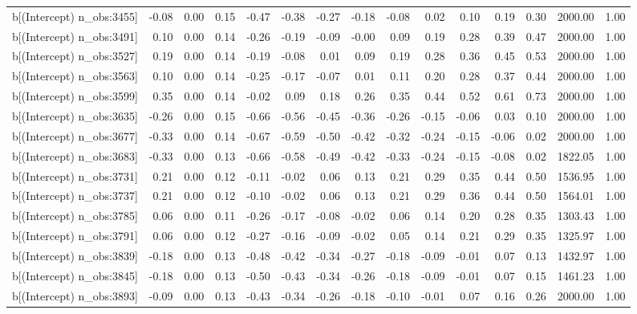 \begin{table}[ht]
\begin{tabular}{rrrrrrrrrrrrrrr}
  b[(Intercept) n\_obs:3455] & -0.08 & 0.00 & 0.15 & -0.47 & -0.38 & -0.27 & -0.18 & -0.08 & 0.02 & 0.10 & 0.19 & 0.30 & 2000.00 & 1.00 \\ 
  b[(Intercept) n\_obs:3491] & 0.10 & 0.00 & 0.14 & -0.26 & -0.19 & -0.09 & -0.00 & 0.09 & 0.19 & 0.28 & 0.39 & 0.47 & 2000.00 & 1.00 \\ 
  b[(Intercept) n\_obs:3527] & 0.19 & 0.00 & 0.14 & -0.19 & -0.08 & 0.01 & 0.09 & 0.19 & 0.28 & 0.36 & 0.45 & 0.53 & 2000.00 & 1.00 \\ 
  b[(Intercept) n\_obs:3563] & 0.10 & 0.00 & 0.14 & -0.25 & -0.17 & -0.07 & 0.01 & 0.11 & 0.20 & 0.28 & 0.37 & 0.44 & 2000.00 & 1.00 \\ 
  b[(Intercept) n\_obs:3599] & 0.35 & 0.00 & 0.14 & -0.02 & 0.09 & 0.18 & 0.26 & 0.35 & 0.44 & 0.52 & 0.61 & 0.73 & 2000.00 & 1.00 \\ 
  b[(Intercept) n\_obs:3635] & -0.26 & 0.00 & 0.15 & -0.66 & -0.56 & -0.45 & -0.36 & -0.26 & -0.15 & -0.06 & 0.03 & 0.10 & 2000.00 & 1.00 \\ 
  b[(Intercept) n\_obs:3677] & -0.33 & 0.00 & 0.14 & -0.67 & -0.59 & -0.50 & -0.42 & -0.32 & -0.24 & -0.15 & -0.06 & 0.02 & 2000.00 & 1.00 \\ 
  b[(Intercept) n\_obs:3683] & -0.33 & 0.00 & 0.13 & -0.66 & -0.58 & -0.49 & -0.42 & -0.33 & -0.24 & -0.15 & -0.08 & 0.02 & 1822.05 & 1.00 \\ 
  b[(Intercept) n\_obs:3731] & 0.21 & 0.00 & 0.12 & -0.11 & -0.02 & 0.06 & 0.13 & 0.21 & 0.29 & 0.35 & 0.44 & 0.50 & 1536.95 & 1.00 \\ 
  b[(Intercept) n\_obs:3737] & 0.21 & 0.00 & 0.12 & -0.10 & -0.02 & 0.06 & 0.13 & 0.21 & 0.29 & 0.36 & 0.44 & 0.50 & 1564.01 & 1.00 \\ 
  b[(Intercept) n\_obs:3785] & 0.06 & 0.00 & 0.11 & -0.26 & -0.17 & -0.08 & -0.02 & 0.06 & 0.14 & 0.20 & 0.28 & 0.35 & 1303.43 & 1.00 \\ 
  b[(Intercept) n\_obs:3791] & 0.06 & 0.00 & 0.12 & -0.27 & -0.16 & -0.09 & -0.02 & 0.05 & 0.14 & 0.21 & 0.29 & 0.35 & 1325.97 & 1.00 \\ 
  b[(Intercept) n\_obs:3839] & -0.18 & 0.00 & 0.13 & -0.48 & -0.42 & -0.34 & -0.27 & -0.18 & -0.09 & -0.01 & 0.07 & 0.13 & 1432.97 & 1.00 \\ 
  b[(Intercept) n\_obs:3845] & -0.18 & 0.00 & 0.13 & -0.50 & -0.43 & -0.34 & -0.26 & -0.18 & -0.09 & -0.01 & 0.07 & 0.15 & 1461.23 & 1.00 \\ 
  b[(Intercept) n\_obs:3893] & -0.09 & 0.00 & 0.13 & -0.43 & -0.34 & -0.26 & -0.18 & -0.10 & -0.01 & 0.07 & 0.16 & 0.26 & 2000.00 & 1.00 \\ 

\end{tabular}
\end{table}
